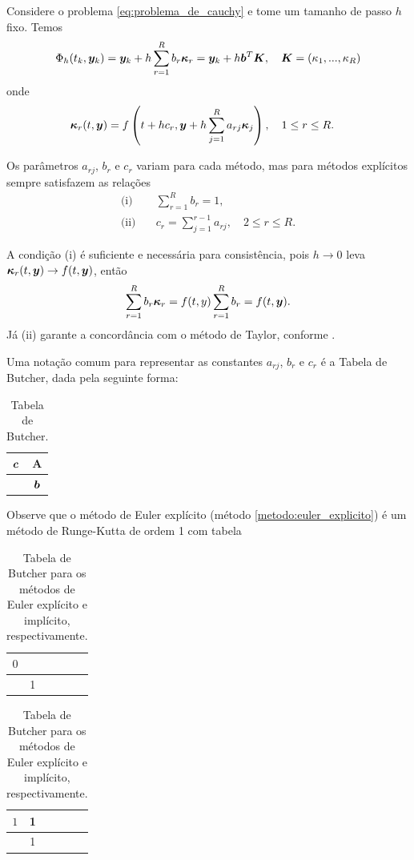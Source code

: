 \begin{method}\label{metodo:rk_r_estagios}
    Considere o problema \ref{eq:problema_de_cauchy} e tome um tamanho de passo $h$ fixo. Temos
    \begin{equation*}
        \Phi_h(t_k, \bm y_k) = \bm y_k + h \sum_{r=1}^{R} b_r \bm \kappa_r = \bm y_k + h \bm b^T \bm K,
        \quad \bm K = (\kappa_1, ..., \kappa_R)
    \end{equation*}
    onde
    \begin{align*}
        \bm \kappa_r (t,\bm y) &= f\left(t + h c_r, \bm y + h \sum_{j=1}^R a_{rj} \bm \kappa_j \right),
        \quad 1 \leq r \leq R.
    \end{align*}
\end{method}

Os parâmetros $a_{rj}$, $b_r$ e $c_r$ variam para cada método, mas para métodos explícitos sempre satisfazem as relações
\begin{equation}\label{eq:hipoteses_runge_kutta_explicito}
    \begin{aligned}
        \text{(i)} \quad & \sum_{r=1}^{R} b_r = 1, \\
        \text{(ii)} \quad & c_r = \sum_{j=1}^{r-1} a_{rj}, \quad 2 \leq r \leq R.
    \end{aligned}
\end{equation}

A condição (i) é suficiente e necessária para consistência, pois $h \to 0$ leva $\bm \kappa_r (t, \bm y) \to f (t, \bm y)$, então
\begin{equation*}
    \sum_{r=1}^{R} b_r \bm \kappa_r  = f(t,y) \sum_{r=1}^R b_r = f(t,\bm y).
\end{equation*}
Já (ii) garante a concordância com o método de Taylor, conforme \cite[45]{alexandre_megiorin_roma_metodos_nodate}.

Uma notação comum para representar as constantes $a_{rj}$, $b_r$ e $c_r$ é a Tabela de Butcher, dada pela seguinte forma:
\begin{table}
    \centering
    \begin{tabular}{c|c}
         $\bm c$ & $\bm A$\\
         \hline
                  & $\bm b$
    \end{tabular}
    \caption{Tabela de Butcher.}
\end{table}

Observe que o método de Euler explícito (método \ref{metodo:euler_explicito}) é um método de Runge-Kutta de ordem 1 com tabela
\begin{table}
    \centering
    \begin{tabular}{c|ccccc}
         $0$      & \\
         \hline
                  & 1
    \end{tabular}
    \quad
    \begin{tabular}{c|ccccc}
         $1$      & 1  \\
         \hline
                  & 1
    \end{tabular}
    \caption{Tabela de Butcher para os métodos de Euler explícito e implícito, respectivamente.}
\end{table}

